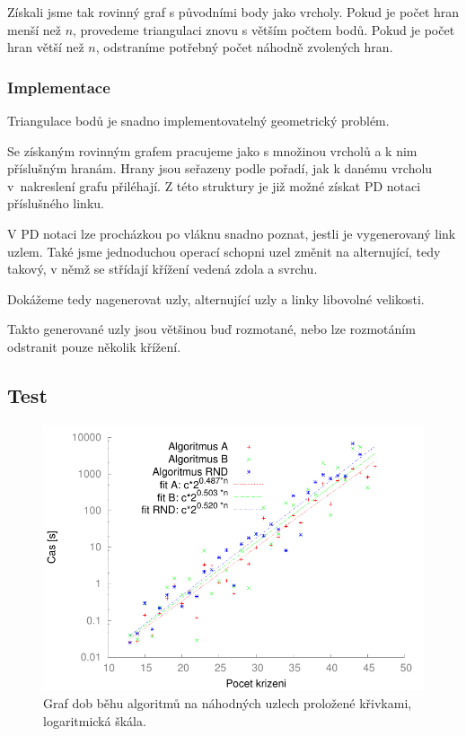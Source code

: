 Získali jsme tak rovinný graf s původními body jako vrcholy. Pokud je počet hran menší než $n$, provedeme triangulaci znovu s větším počtem bodů. Pokud je počet hran větší než $n$, odstraníme potřebný počet náhodně zvolených hran.


\subsubsection{Implementace}

Triangulace bodů je snadno implementovatelný geometrický problém. 

Se získaným rovinným grafem pracujeme jako s množinou vrcholů a k nim příslušným hranám. Hrany jsou seřazeny podle pořadí, jak k danému vrcholu v~nakreslení grafu přiléhají. Z této struktury je již možné získat PD notaci příslušného linku.


V PD notaci lze procházkou po vláknu snadno poznat, jestli je vygenerovaný link uzlem. Také jsme jednoduchou operací schopni uzel změnit na alternující, tedy takový, v němž se střídají křížení vedená zdola a svrchu.

Dokážeme tedy nagenerovat uzly, alternující uzly a linky libovolné velikosti.

Takto generované uzly jsou většinou buď rozmotané, nebo lze rozmotáním odstranit pouze několik křížení.

\subsection{Test}

\begin{figure}[p]\centering
\includegraphics{../img/knotsFIT}
\caption{Graf dob běhu algoritmů na náhodných uzlech proložené křivkami, logaritmická škála.}
\label{obr03:knotSrov}
\end{figure}


